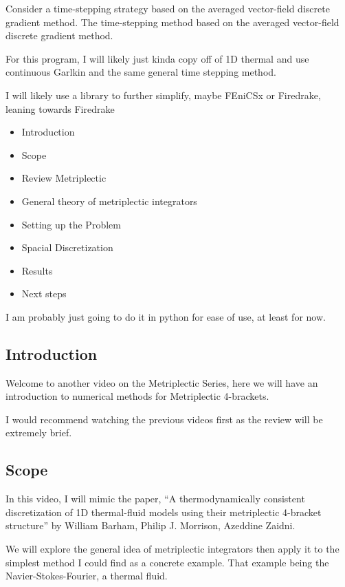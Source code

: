 Consider a time-stepping strategy based on the averaged vector-field discrete gradient method. The time-stepping method based on the averaged vector-field discrete gradient method.


For this program, I will likely just kinda copy off of 1D thermal and use continuous Garlkin and the same general time stepping method.

I will likely use a library to further simplify, maybe FEniCSx or Firedrake, leaning towards Firedrake

\begin{itemize}
  \item Introduction
  \item Scope
  \item Review Metriplectic
  \item General theory of metriplectic integrators
  \item Setting up the Problem
  \item Spacial Discretization
  \item Results
  \item Next steps
\end{itemize}

I am probably just going to do it in python for ease of use, at least for now.

\subsection{Introduction}

Welcome to another video on the Metriplectic Series, here we will have an introduction to numerical methods for Metriplectic 4-brackets.

I would recommend watching the previous videos first as the review will be extremely brief.

\subsection{Scope}

In this video, I will mimic the paper, ``A thermodynamically consistent discretization of 1D thermal-fluid models using their metriplectic 4-bracket structure'' by William Barham, Philip J. Morrison, Azeddine Zaidni.

We will explore the general idea of metriplectic integrators then apply it to the simplest method I could find as a concrete example. That example being the Navier-Stokes-Fourier, a thermal fluid.

